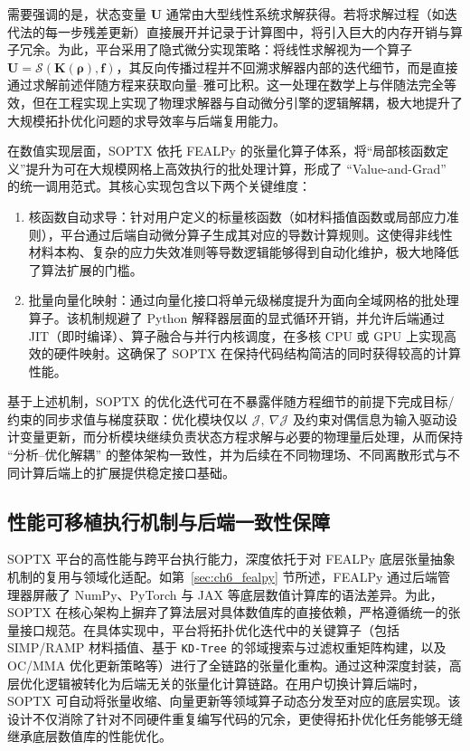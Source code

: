 需要强调的是，状态变量 $\boldsymbol{U}$ 通常由大型线性系统求解获得。若将求解过程（如迭代法的每一步残差更新）直接展开并记录于计算图中，将引入巨大的内存开销与算子冗余。为此，平台采用了隐式微分实现策略：将线性求解视为一个算子 $\boldsymbol{U} = \mathcal{S}(\boldsymbol{K}(\boldsymbol{\rho}), \boldsymbol{f})$，其反向传播过程并不回溯求解器内部的迭代细节，而是直接通过求解前述伴随方程来获取向量--雅可比积。这一处理在数学上与伴随法完全等效，但在工程实现上实现了物理求解器与自动微分引擎的逻辑解耦，极大地提升了大规模拓扑优化问题的求导效率与后端复用能力。

在数值实现层面，SOPTX 依托 FEALPy 的张量化算子体系，将“局部核函数定义”提升为可在大规模网格上高效执行的批处理计算，形成了 “Value-and-Grad” 的统一调用范式。其核心实现包含以下两个关键维度：
\begin{enumerate}
	\item 核函数自动求导：针对用户定义的标量核函数（如材料插值函数或局部应力准则），平台通过后端自动微分算子生成其对应的导数计算规则。这使得非线性材料本构、复杂的应力失效准则等导数逻辑能够得到自动化维护，极大地降低了算法扩展的门槛。

	\item 批量向量化映射：通过向量化接口将单元级梯度提升为面向全域网格的批处理算子。该机制规避了 Python 解释器层面的显式循环开销，并允许后端通过 JIT（即时编译）、算子融合与并行内核调度，在多核 CPU 或 GPU 上实现高效的硬件映射。这确保了 SOPTX 在保持代码结构简洁的同时获得较高的计算性能。
\end{enumerate}
基于上述机制，SOPTX 的优化迭代可在不暴露伴随方程细节的前提下完成目标/约束的同步求值与梯度获取：优化模块仅以  $\mathcal{J},\ \nabla\mathcal{J}$ 及约束对偶信息为输入驱动设计变量更新，而分析模块继续负责状态方程求解与必要的物理量后处理，从而保持 “分析--优化解耦” 的整体架构一致性，并为后续在不同物理场、不同离散形式与不同计算后端上的扩展提供稳定接口基础。


\subsection{性能可移植执行机制与后端一致性保障}
\label{subsec:muti_backend}

SOPTX 平台的高性能与跨平台执行能力，深度依托于对 FEALPy 底层张量抽象机制的复用与领域化适配。如第~\ref{sec:ch6_fealpy} 节所述，FEALPy 通过后端管理器屏蔽了 NumPy、PyTorch 与 JAX 等底层数值计算库的语法差异。为此，SOPTX 在核心架构上摒弃了算法层对具体数值库的直接依赖，严格遵循统一的张量接口规范。在具体实现中，平台将拓扑优化迭代中的关键算子（包括 SIMP/RAMP 材料插值、基于 \texttt{KD-Tree} 的邻域搜索与过滤权重矩阵构建，以及 OC/MMA 优化更新策略等）进行了全链路的张量化重构。通过这种深度封装，高层优化逻辑被转化为后端无关的张量化计算链路。在用户切换计算后端时，SOPTX 可自动将张量收缩、向量更新等领域算子动态分发至对应的底层实现。该设计不仅消除了针对不同硬件重复编写代码的冗余，更使得拓扑优化任务能够无缝继承底层数值库的性能优化。

